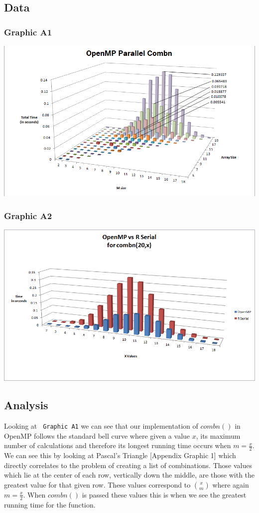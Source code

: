 \documentclass[titlepage, 11pt]{article}
\begin{document}
\subsection{Data}
\subsubsection{Graphic A1}
\includegraphics[scale = 0.5]{images/3D-OMP.png} \\
\subsubsection{Graphic A2}
\includegraphics[scale = 0.5]{images/OMPvsR.png}

\subsection{Analysis}
Looking at \verb; Graphic A1; we can see that our implementation of $combn()$ in OpenMP follows the standard bell curve where given a value $x$, its maximum number of calculations and therefore its longest running time occurs when $m = \frac{x}{2}$. We can see this by looking at Pascal's Triangle [Appendix Graphic 1] which directly correlates to the problem of creating a list of combinations. Those values which lie at the center of each row, vertically down the middle, are those with the greatest value for that given row. These values correspond to ${x \choose m}$ where again $m = \frac{x}{2}$. When $combn()$ is passed these values this is when we see the greatest running time for the function. \\
\end{document}
